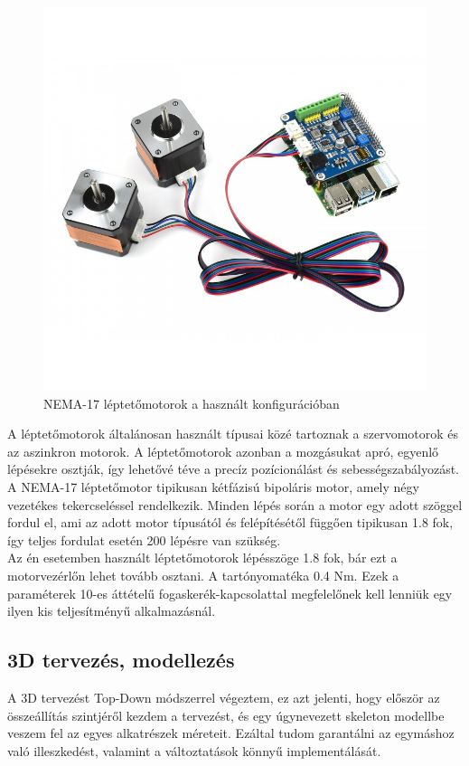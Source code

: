 \documentclass[12pt,a4paper]{article}
\begin{document}
\begin{figure}[h!]
	\centering
	\includegraphics[width=0.8\linewidth]{mech_stepper}
	\caption{NEMA-17 léptetőmotorok a használt konfigurációban}
	\label{fig:mech_stepper}
\end{figure}

A léptetőmotorok általánosan használt típusai közé tartoznak a szervomotorok és az aszinkron motorok. A léptetőmotorok azonban a mozgásukat apró, egyenlő lépésekre osztják, így lehetővé téve a precíz pozícionálást és sebességszabályozást. A NEMA-17 léptetőmotor tipikusan kétfázisú bipoláris motor, amely négy vezetékes tekercseléssel rendelkezik. Minden lépés során a motor egy adott szöggel fordul el, ami az adott motor típusától és felépítésétől függően tipikusan 1.8 fok, így teljes fordulat esetén 200 lépésre van szükség.\\

Az én esetemben használt léptetőmotorok lépésszöge 1.8 fok, bár ezt a motorvezérlőn lehet tovább osztani. A tartónyomatéka 0.4 Nm. Ezek a paraméterek 10-es áttételű fogaskerék-kapcsolattal megfelelőnek kell lenniük egy ilyen kis teljesítményű alkalmazásnál.

\pagebreak

\subsection{3D tervezés, modellezés}
A 3D tervezést Top-Down módszerrel végeztem, ez azt jelenti, hogy először az összeállítás szintjéről kezdem a tervezést, és egy úgynevezett skeleton modellbe veszem fel az egyes alkatrészek méreteit. Ezáltal tudom garantálni az egymáshoz való illeszkedést, valamint a változtatások könnyű implementálását.\\
\end{document}
